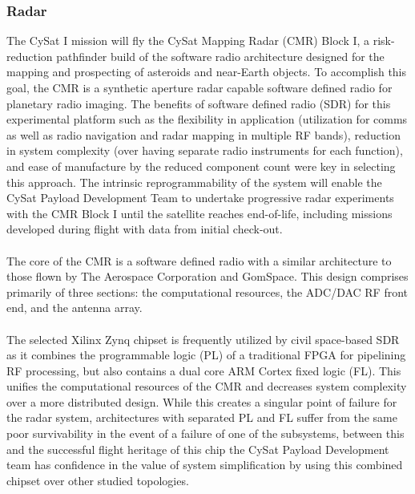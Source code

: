 \documentclass[nocover]            %
{CSLI}                       %
\begin{document}
\subsubsection{Radar}
The CySat I mission will fly the CySat Mapping Radar (CMR) Block I, a risk-reduction pathfinder build of the software radio architecture designed for the mapping and prospecting of asteroids and near-Earth objects. To accomplish this goal, the CMR is a synthetic aperture radar capable software defined radio for planetary radio imaging. The benefits of software defined radio (SDR) for this experimental platform such as the flexibility in application (utilization for comms as well as radio navigation and radar mapping in multiple RF bands), reduction in system complexity (over having separate radio instruments for each function), and ease of manufacture by the reduced component count were key in selecting this approach. The intrinsic reprogrammability of the system will enable the CySat Payload Development Team to undertake progressive radar experiments with the CMR Block I until the satellite reaches end-of-life, including missions developed during flight with data from initial check-out.\\
\\The core of the CMR is a software defined radio with a similar architecture to those flown by The Aerospace Corporation and GomSpace. This design comprises primarily of three sections: the computational resources, the ADC/DAC RF front end, and the antenna array.\\
\\The selected Xilinx Zynq chipset is frequently utilized by civil space-based SDR as it combines the programmable logic (PL) of a traditional FPGA for pipelining RF processing, but also contains a dual core ARM Cortex fixed logic (FL). This unifies the computational resources of the CMR and decreases system complexity over a more distributed design. While this creates a singular point of failure for the radar system, architectures with separated PL and FL suffer from the same poor survivability in the event of a failure of one of the subsystems, between this and the successful flight heritage of this chip the CySat Payload Development team has confidence in the value of system simplification by using this combined chipset over other studied topologies.\\
\end{document}
